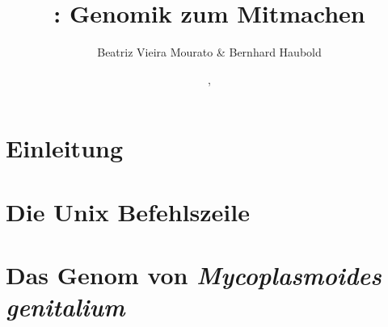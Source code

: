 \documentclass[a4paper]{report}
\begin{document}
\title{: Genomik zum Mitmachen\\\scriptsize {}}
\author{Beatriz Vieira Mourato \& Bernhard Haubold}
\date{\hspace{-3pt}, }
\maketitle

\tableofcontents

\chapter{Einleitung}\label{ch:intro}

\chapter{Die Unix Befehlszeile}

\chapter{Das Genom von \emph{Mycoplasmoides genitalium}}



\end{document}
